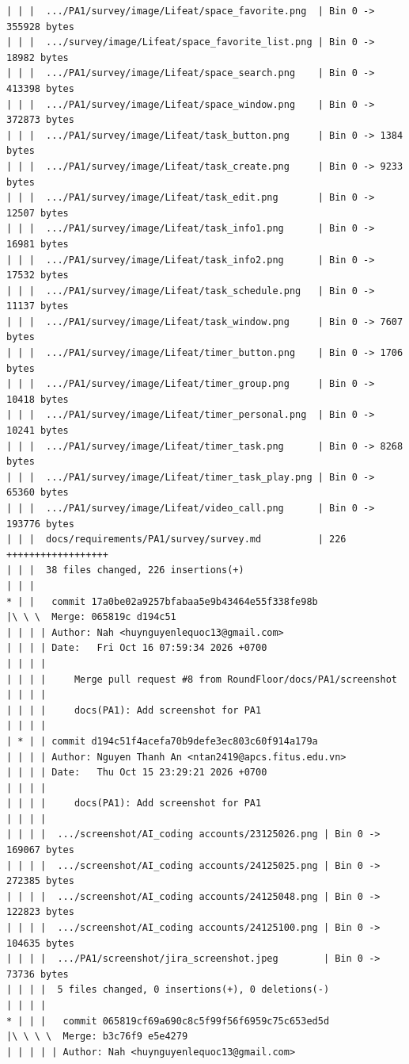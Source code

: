\documentclass[12pt]{article}
\begin{document}
\begin{lstlisting}[numbers=none,breaklines=true]
| | |  .../PA1/survey/image/Lifeat/space_favorite.png  | Bin 0 -> 355928 bytes
| | |  .../survey/image/Lifeat/space_favorite_list.png | Bin 0 -> 18982 bytes
| | |  .../PA1/survey/image/Lifeat/space_search.png    | Bin 0 -> 413398 bytes
| | |  .../PA1/survey/image/Lifeat/space_window.png    | Bin 0 -> 372873 bytes
| | |  .../PA1/survey/image/Lifeat/task_button.png     | Bin 0 -> 1384 bytes
| | |  .../PA1/survey/image/Lifeat/task_create.png     | Bin 0 -> 9233 bytes
| | |  .../PA1/survey/image/Lifeat/task_edit.png       | Bin 0 -> 12507 bytes
| | |  .../PA1/survey/image/Lifeat/task_info1.png      | Bin 0 -> 16981 bytes
| | |  .../PA1/survey/image/Lifeat/task_info2.png      | Bin 0 -> 17532 bytes
| | |  .../PA1/survey/image/Lifeat/task_schedule.png   | Bin 0 -> 11137 bytes
| | |  .../PA1/survey/image/Lifeat/task_window.png     | Bin 0 -> 7607 bytes
| | |  .../PA1/survey/image/Lifeat/timer_button.png    | Bin 0 -> 1706 bytes
| | |  .../PA1/survey/image/Lifeat/timer_group.png     | Bin 0 -> 10418 bytes
| | |  .../PA1/survey/image/Lifeat/timer_personal.png  | Bin 0 -> 10241 bytes
| | |  .../PA1/survey/image/Lifeat/timer_task.png      | Bin 0 -> 8268 bytes
| | |  .../PA1/survey/image/Lifeat/timer_task_play.png | Bin 0 -> 65360 bytes
| | |  .../PA1/survey/image/Lifeat/video_call.png      | Bin 0 -> 193776 bytes
| | |  docs/requirements/PA1/survey/survey.md          | 226 ++++++++++++++++++
| | |  38 files changed, 226 insertions(+)
| | |
* | |   commit 17a0be02a9257bfabaa5e9b43464e55f338fe98b
|\ \ \  Merge: 065819c d194c51
| | | | Author: Nah <huynguyenlequoc13@gmail.com>
| | | | Date:   Fri Oct 16 07:59:34 2026 +0700
| | | |
| | | |     Merge pull request #8 from RoundFloor/docs/PA1/screenshot
| | | |
| | | |     docs(PA1): Add screenshot for PA1
| | | |
| * | | commit d194c51f4acefa70b9defe3ec803c60f914a179a
| | | | Author: Nguyen Thanh An <ntan2419@apcs.fitus.edu.vn>
| | | | Date:   Thu Oct 15 23:29:21 2026 +0700
| | | |
| | | |     docs(PA1): Add screenshot for PA1
| | | |
| | | |  .../screenshot/AI_coding accounts/23125026.png | Bin 0 -> 169067 bytes
| | | |  .../screenshot/AI_coding accounts/24125025.png | Bin 0 -> 272385 bytes
| | | |  .../screenshot/AI_coding accounts/24125048.png | Bin 0 -> 122823 bytes
| | | |  .../screenshot/AI_coding accounts/24125100.png | Bin 0 -> 104635 bytes
| | | |  .../PA1/screenshot/jira_screenshot.jpeg        | Bin 0 -> 73736 bytes
| | | |  5 files changed, 0 insertions(+), 0 deletions(-)
| | | |
* | | |   commit 065819cf69a690c8c5f99f56f6959c75c653ed5d
|\ \ \ \  Merge: b3c76f9 e5e4279
| | | | | Author: Nah <huynguyenlequoc13@gmail.com>

\end{lstlisting}
\end{document}
